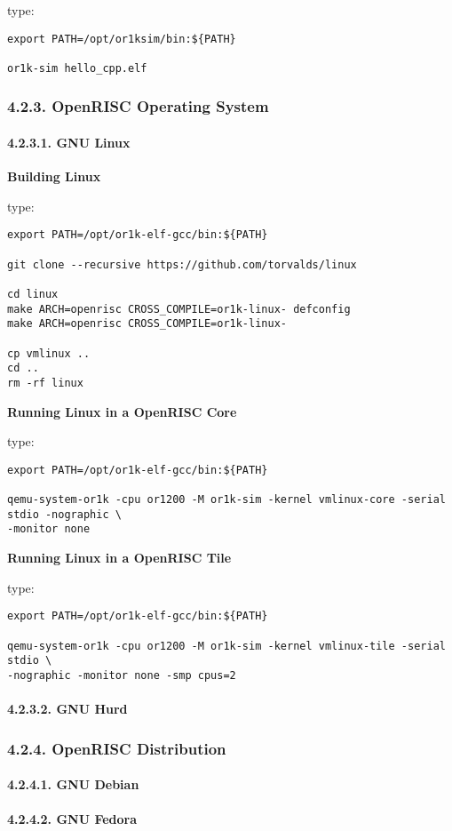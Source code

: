 \documentclass[]{article}
\let\oldparagraph\paragraph
\renewcommand{\paragraph}[1]{\oldparagraph{#1}\mbox{}}
\begin{document}
type:

\begin{verbatim}
export PATH=/opt/or1ksim/bin:${PATH}

or1k-sim hello_cpp.elf
\end{verbatim}

\subsubsection{4.2.3. OpenRISC Operating
System}\label{openrisc-operating-system}

\paragraph{4.2.3.1. GNU Linux}\label{gnu-linux}

\textbf{Building Linux}

type:

\begin{verbatim}
export PATH=/opt/or1k-elf-gcc/bin:${PATH}

git clone --recursive https://github.com/torvalds/linux

cd linux
make ARCH=openrisc CROSS_COMPILE=or1k-linux- defconfig
make ARCH=openrisc CROSS_COMPILE=or1k-linux-

cp vmlinux ..
cd ..
rm -rf linux
\end{verbatim}

\textbf{Running Linux in a OpenRISC Core}

type:

\begin{verbatim}
export PATH=/opt/or1k-elf-gcc/bin:${PATH}

qemu-system-or1k -cpu or1200 -M or1k-sim -kernel vmlinux-core -serial stdio -nographic \
-monitor none
\end{verbatim}

\textbf{Running Linux in a OpenRISC Tile}

type:

\begin{verbatim}
export PATH=/opt/or1k-elf-gcc/bin:${PATH}

qemu-system-or1k -cpu or1200 -M or1k-sim -kernel vmlinux-tile -serial stdio \
-nographic -monitor none -smp cpus=2
\end{verbatim}

\paragraph{4.2.3.2. GNU Hurd}\label{gnu-hurd}

\subsubsection{4.2.4. OpenRISC
Distribution}\label{openrisc-distribution}

\paragraph{4.2.4.1. GNU Debian}\label{gnu-debian}

\paragraph{4.2.4.2. GNU Fedora}\label{gnu-fedora}
\end{document}
